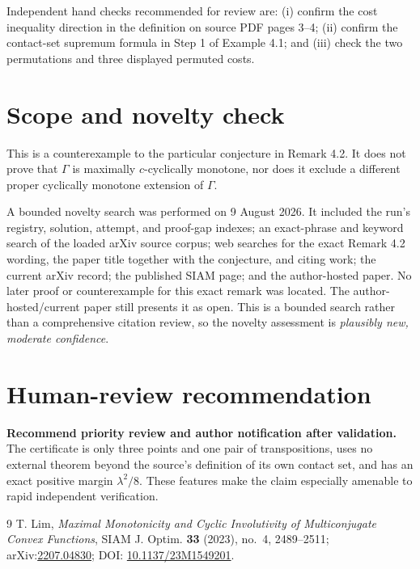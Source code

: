 \documentclass[11pt]{article}
\begin{document}
Independent hand checks recommended for review are: (i) confirm the cost
inequality direction in the definition on source PDF pages 3--4; (ii)
confirm the contact-set supremum formula in Step 1 of Example 4.1; and (iii)
check the two permutations and three displayed permuted costs.

\section{Scope and novelty check}

This is a counterexample to the particular conjecture in Remark 4.2.  It
does not prove that \(\Gamma\) is maximally \(c\)-cyclically monotone, nor
does it exclude a different proper cyclically monotone extension of
\(\Gamma\).

A bounded novelty search was performed on 9 August 2026.  It included the
run's registry, solution, attempt, and proof-gap indexes; an exact-phrase and
keyword search of the loaded arXiv source corpus; web searches for the exact
Remark 4.2 wording, the paper title together with the conjecture, and citing
work; the current arXiv record; the published SIAM page; and the
author-hosted paper.  No later proof or counterexample for this exact remark
was located.  The author-hosted/current paper still presents it as open.
This is a bounded search rather than a comprehensive citation review, so the
novelty assessment is \emph{plausibly new, moderate confidence}.

\section{Human-review recommendation}

\textbf{Recommend priority review and author notification after validation.}
The certificate is only three points and one pair of transpositions, uses no
external theorem beyond the source's definition of its own contact set, and
has an exact positive margin \(\lambda^2/8\).  These features make the claim
especially amenable to rapid independent verification.

\begin{thebibliography}{9}
T. Lim,
\emph{Maximal Monotonicity and Cyclic Involutivity of Multiconjugate Convex
Functions}, SIAM J. Optim. \textbf{33} (2023), no.~4, 2489--2511;
arXiv:\href{https://arxiv.org/abs/2207.04830}{2207.04830};
DOI: \href{https://doi.org/10.1137/23M1549201}{10.1137/23M1549201}.
\end{thebibliography}
\end{document}
